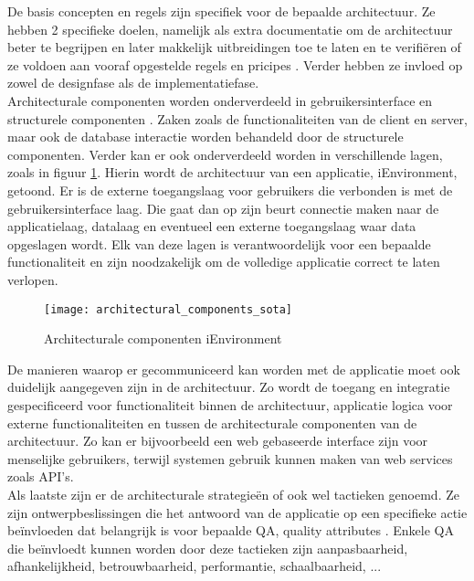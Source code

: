 De basis concepten en regels zijn specifiek voor de bepaalde architectuur. Ze hebben 2 specifieke doelen, namelijk als extra documentatie om de architectuur beter te begrijpen en later makkelijk uitbreidingen toe te laten en te verifiëren of ze voldoen aan vooraf opgestelde regels en pricipes \autocite{Oussalah2013}. Verder hebben ze invloed op zowel de designfase als de implementatiefase.\\

Architecturale componenten worden onderverdeeld in gebruikersinterface en structurele componenten \autocite{EDUCBA2023}. Zaken zoals de functionaliteiten van de client en server, maar ook de database interactie worden behandeld door de structurele componenten. Verder kan er ook onderverdeeld worden in verschillende lagen, zoals in figuur \ref{architectural_components_sota}. Hierin wordt de architectuur van een applicatie, iEnvironment, getoond. Er is de externe toegangslaag voor gebruikers die verbonden is met de gebruikersinterface laag. Die gaat dan op zijn beurt connectie maken naar de applicatielaag, datalaag en eventueel een externe toegangslaag waar data opgeslagen wordt. Elk van deze lagen is verantwoordelijk voor een bepaalde functionaliteit en zijn noodzakelijk om de volledige applicatie correct te laten verlopen.

\begin{figure}[ht]
    \texttt{[image: architectural\_components\_sota]}
    \centering
    \caption{Architecturale componenten iEnvironment \autocite{Alencar2018}}
    \label{architectural_components_sota}
\end{figure}

\bigskip

De manieren waarop er gecommuniceerd kan worden met de applicatie moet ook duidelijk aangegeven zijn in de architectuur. Zo wordt de toegang en integratie gespecificeerd voor functionaliteit binnen de architectuur, applicatie logica voor externe functionaliteiten en tussen de architecturale componenten van de architectuur. Zo kan er bijvoorbeeld een web gebaseerde interface zijn voor menselijke gebruikers, terwijl systemen gebruik kunnen maken van web services zoals API's.\\

Als laatste zijn er de architecturale strategieën of ook wel tactieken genoemd. Ze zijn  ontwerpbeslissingen die het antwoord van de applicatie op een specifieke actie beïnvloeden dat belangrijk is voor bepaalde QA, quality attributes \autocite{Marquez2023}. Enkele QA die beïnvloedt kunnen worden door deze tactieken zijn aanpasbaarheid, afhankelijkheid, betrouwbaarheid, performantie, schaalbaarheid, ...

